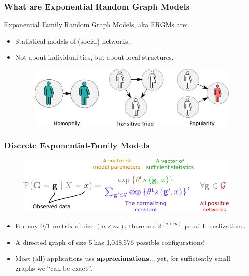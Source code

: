 \documentclass[aspectratio=169, 9pt]{beamer}
\begin{document}
\begin{frame}
\frametitle{What are Exponential Random Graph Models}

Exponential Family Random Graph Models, aka \alert{ERGMs} are:\pause

\begin{itemize}
\item Statistical models of (social) networks.\pause
\item Not about individual ties, but about local structures.\pause
\begin{figure}
\includegraphics[width=.6\linewidth]{friendly-terms.pdf}
\end{figure}
\end{itemize}

\end{frame}

\begin{frame}[t,label=discrete-exponential]
	
	\frametitle{Discrete Exponential-Family Models}
	
	\begin{figure}
		\includegraphics[width=.7\linewidth]{parts-of-ergm.pdf}
	\end{figure}\pause
	
	\vfill
		
	\begin{itemize}
		\item For any 0/1 matrix of size $(n\times m)$, there are $2^{(n\times m)}$ possible realizations.\pause
		\item A directed graph of size 5 has 1,048,576 possible configurations!\pause
		\item Most (all) applications use \textbf{approximations}...\pause{} yet, for sufficiently small graphs we ``can be exact''.
	\end{itemize}
	
	\vfill\hfill\hyperlink{discrete-exponential-theory}{} %
	\hyperlink{ergm-terms}{}
	
\end{frame}
\end{document}
